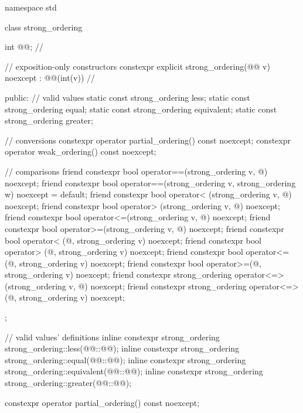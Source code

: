 %
%
%
%
%
\begin{codeblock}
namespace std {
  class strong_ordering {
    int @@;  // \expos

    // exposition-only constructors
    constexpr explicit strong_ordering(@@ v) noexcept : @@(int(v)) {}   // \expos

  public:
    // valid values
    static const strong_ordering less;
    static const strong_ordering equal;
    static const strong_ordering equivalent;
    static const strong_ordering greater;

    // conversions
    constexpr operator partial_ordering() const noexcept;
    constexpr operator weak_ordering() const noexcept;

    // comparisons
    friend constexpr bool operator==(strong_ordering v, @\unspec@) noexcept;
    friend constexpr bool operator==(strong_ordering v, strong_ordering w) noexcept = default;
    friend constexpr bool operator< (strong_ordering v, @\unspec@) noexcept;
    friend constexpr bool operator> (strong_ordering v, @\unspec@) noexcept;
    friend constexpr bool operator<=(strong_ordering v, @\unspec@) noexcept;
    friend constexpr bool operator>=(strong_ordering v, @\unspec@) noexcept;
    friend constexpr bool operator< (@\unspec@, strong_ordering v) noexcept;
    friend constexpr bool operator> (@\unspec@, strong_ordering v) noexcept;
    friend constexpr bool operator<=(@\unspec@, strong_ordering v) noexcept;
    friend constexpr bool operator>=(@\unspec@, strong_ordering v) noexcept;
    friend constexpr strong_ordering operator<=>(strong_ordering v, @\unspec@) noexcept;
    friend constexpr strong_ordering operator<=>(@\unspec@, strong_ordering v) noexcept;
  };

  // valid values' definitions
  inline constexpr strong_ordering strong_ordering::less(@@::@@);
  inline constexpr strong_ordering strong_ordering::equal(@@::@@);
  inline constexpr strong_ordering strong_ordering::equivalent(@@::@@);
  inline constexpr strong_ordering strong_ordering::greater(@@::@@);
}
\end{codeblock}

%
\begin{itemdecl}
constexpr operator partial_ordering() const noexcept;
\end{itemdecl}

